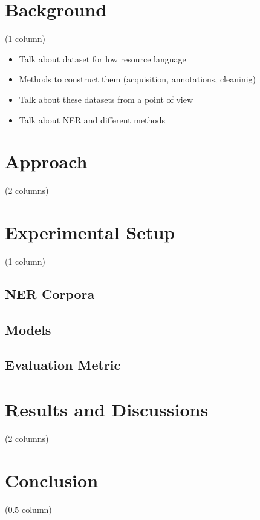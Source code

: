 \documentclass{article}
\begin{document}
\section{Background}
\label{sec:background}
(1 column)
\begin{itemize}
    \item Talk about dataset for low resource language
    \item Methods to construct them (acquisition, annotations, cleaninig)
    \item Talk about these datasets from a point of view
    \item Talk about NER and different methods
\end{itemize}

\section{Approach}
\label{sec:approach}
(2 columns)

\section{Experimental Setup}
\label{sec:experimental_setup}
(1 column)

\subsection{NER Corpora}

\subsection{Models}

\subsection{Evaluation Metric}

\section{Results and Discussions}
\label{sec:experimental_results}
(2 columns)

\section{Conclusion}
\label{sec:conclusion}
(0.5 column)



\end{document}
